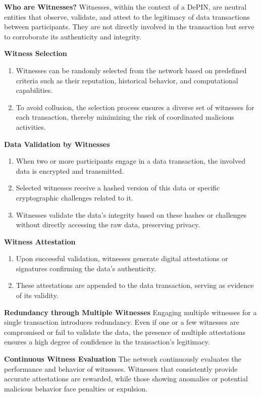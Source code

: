 \documentclass{article}
\begin{document}
\textbf{Who are  Witnesses?} Witnesses, within the context of a DePIN, are neutral entities that observe, validate, and attest to the legitimacy of data transactions between participants. They are not directly involved in the transaction but serve to corroborate its authenticity and integrity.

\textbf{Witness Selection}
\begin{enumerate}
\item Witnesses can be randomly selected from the network based on predefined criteria such as their reputation, historical behavior, and computational capabilities.
\item To avoid collusion, the selection process ensures a diverse set of witnesses for each transaction, thereby minimizing the risk of coordinated malicious activities.
\end{enumerate}

\textbf{Data Validation by Witnesses}
\begin{enumerate}
\item When two or more participants engage in a data transaction, the involved data is encrypted and transmitted.
\item Selected witnesses receive a hashed version of this data or specific cryptographic challenges related to it.
\item Witnesses validate the data's integrity based on these hashes or challenges without directly accessing the raw data, preserving privacy.
\end{enumerate}

\textbf{Witness Attestation}
\begin{enumerate}
\item Upon successful validation, witnesses generate digital attestations or signatures confirming the data's authenticity.
\item These attestations are appended to the data transaction, serving as evidence of its validity.
\end{enumerate}

\textbf{Redundancy through Multiple Witnesses} Engaging multiple witnesses for a single transaction introduces redundancy. Even if one or a few witnesses are compromised or fail to validate the data, the presence of multiple attestations ensures a high degree of confidence in the transaction's legitimacy.

\textbf{Continuous Witness Evaluation} The network continuously evaluates the performance and behavior of witnesses. Witnesses that consistently provide accurate attestations are rewarded, while those showing anomalies or potential malicious behavior face penalties or expulsion.
\end{document}
